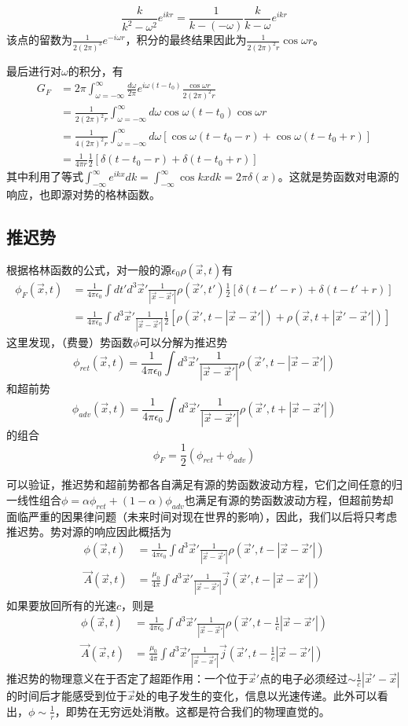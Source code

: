 \documentclass[a4paper,11pt]{ctexbook}
\newcommand{\beq}{\begin{equation}}
\newcommand{\eeq}{\end{equation}}
\newcommand{\bea}{\begin{equation}\begin{aligned}}
\newcommand{\eea}{\end{aligned}\end{equation}}
\newcommand{\epv}{\epsilon_0}
\begin{document}
\beq
\frac{k}{k^2 - \omega^2} e^{ikr} = \frac{1}{k-(-\omega)} \frac{k}{k-\omega}e^{ikr}
\eeq
该点的留数为$\frac{1}{2(2\pi)^3} e^{-i\omega r}$，积分的最终结果因此为$\frac{1}{2(2\pi)^2 r} \cos \omega r$。\par
最后进行对$\omega$的积分，有
\bea
G_F &= 2\pi \int_{\omega = -\infty}^\infty \frac{d\omega}{2\pi} e^{i\omega (t-t_0) }\frac{ \cos \omega r }{2(2\pi)^2r} \\
& = \frac{1}{2(2\pi)^2 r}  \int_{\omega = -\infty}^\infty d\omega \cos \omega(t-t_0) \cos \omega r \\
&= \frac{1}{4(2\pi)^2 r} \int_{\omega = -\infty}^\infty d\omega \left[ \cos \omega(t-t_0 -r) + \cos \omega(t-t_0 + r)\right] \\
&= \frac{1}{4 \pi r} \frac{1}{2}\left[\delta (t-t_0-r) + \delta (t-t_0+r) \right]
\eea
其中利用了等式$\int_{-\infty}^\infty e^{ikx} dk = \int_{-\infty}^\infty \cos kx dk = 2\pi \delta(x)$。这就是势函数对电源的响应，也即源对势的格林函数。
\subsection{推迟势}
根据格林函数的公式，对一般的源$\epv \rho(\vec{x},t)$有
\bea
\phi_F(\vec{x},t) &=\frac{1}{4\pi \epv}  \int dt'd^3 \vec{x}' \frac{1}{|\vec{x}-\vec{x}'|} \rho(\vec{x}',t') \frac{1}{2}\left[\delta (t-t'-r) + \delta (t-t'+r) \right]\\
&= \frac{1}{4\pi \epv} \int d^3 \vec{x}' \frac{1}{|\vec{x}-\vec{x}'|}\frac{1}{2} \left[\rho(\vec{x}',t-|\vec{x}-\vec{x}'|) + \rho(\vec{x},t+|\vec{x}'-\vec{x}'|) \right]
\eea
这里发现，（费曼）势函数$\phi$可以分解为推迟势
\beq
\phi_{ret} (\vec{x},t) = \frac{1}{4\pi \epv} \int d^3 \vec{x}' \frac{1}{|\vec{x}-\vec{x}'|} \rho(\vec{x}',t-|\vec{x}-\vec{x}'|) 
\eeq
和超前势
\beq
\phi_{adv} (\vec{x},t) = \frac{1}{4\pi \epv} \int d^3 \vec{x}' \frac{1}{|\vec{x}-\vec{x}'|} \rho(\vec{x}',t+|\vec{x}-\vec{x}'| )
\eeq
的组合
\beq
\phi_F = \frac{1}{2}(\phi_{ret} + \phi_{adv})
\eeq
\par
可以验证，推迟势和超前势都各自满足有源的势函数波动方程，它们之间任意的归一线性组合$\phi = \alpha \phi_{ret} + (1-\alpha) \phi_{adv}$也满足有源的势函数波动方程，但超前势却面临严重的因果律问题（未来时间对现在世界的影响），因此，我们以后将只考虑推迟势。势对源的响应因此概括为
\bea \label{retp}
\phi(\vec x,t) &= \frac{1}{4\pi \epv} \int d^3 \vec{x}' \frac{1}{|\vec{x}-\vec{x}'|} \rho(\vec{x}',t-|\vec{x}-\vec{x}'|)  \\
\vec A (\vec x,t) &= \frac{\mu_0 }{4\pi } \int d^3 \vec{x}' \frac{1}{|\vec{x}-\vec{x}'|} \vec j (\vec{x}',t-|\vec{x}-\vec{x}'|) 
\eea
如果要放回所有的光速$c$，则是
\bea
\phi(\vec x,t) &= \frac{1}{4\pi \epv} \int d^3 \vec{x}' \frac{1}{|\vec{x}-\vec{x}'|} \rho(\vec{x}',t-\frac{1}{c}|\vec{x}-\vec{x}'|)  \\
\vec A (\vec x,t) &= \frac{\mu_0 }{4\pi } \int d^3 \vec{x}' \frac{1}{|\vec{x}-\vec{x}'|} \vec j (\vec{x}',t-\frac{1}{c}|\vec{x}-\vec{x}'|) 
\eea
推迟势的物理意义在于否定了超距作用：一个位于$\vec{x}'$点的电子必须经过$\sim \frac{1}{c} \left| \vec{x}' - \vec{x} \right|$的时间后才能感受到位于$\vec{x}$处的电子发生的变化，信息以光速传递。此外可以看出，$\phi \sim \frac{1}{r}$，即势在无穷远处消散。这都是符合我们的物理直觉的。
\end{document}
